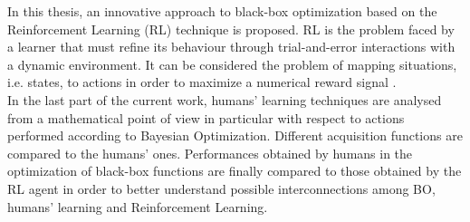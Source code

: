 In this thesis, an innovative approach to black-box optimization based on the Reinforcement Learning (RL) technique is proposed. RL is the problem faced by a learner that must refine its behaviour through trial-and-error interactions with a dynamic environment. It can be considered the problem of mapping situations, i.e. states, to actions in order to maximize a numerical reward signal \cite{RLDef1}. \\

In the last part of the current work, humans' learning techniques are analysed from a mathematical point of view in particular with respect to actions performed according to Bayesian Optimization. Different acquisition functions are compared to the humans' ones. Performances obtained by humans in the optimization of black-box functions are finally compared to those obtained by the RL agent in order to better understand possible interconnections among BO, humans' learning and Reinforcement Learning.